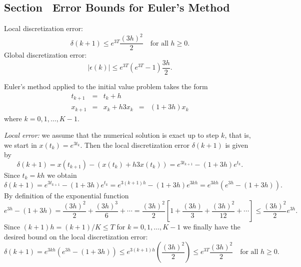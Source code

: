 \subsection*{Section~\protect{\ref{sec:EEEM}} Error Bounds for Euler's Method}

 \ans Local discretization error:
\[
\delta(k+1) \le
e^{3T}\frac{(3h)^2}{2} \quad \mbox{for all $h\ge 0$.}
\]
Global discretization error:
\[
|\epsilon(k)| \le e^{3T}(e^{3T}-1)\frac{3h}{2}.
\]

\soln Euler's method applied to the initial value problem takes the form
\[
\begin{array}{rclcl}
t_{k+1} & = & t_k+h & & \\
x_{k+1} & = & x_k + h 3 x_k & = & (1+3h)x_k
\end{array}
\]
where $k=0,1,\ldots,K-1$.

{\em Local error:} we assume that the
numerical solution is exact up to step $k$, that is,
we start in $x(t_k)=e^{3t_k}$.  Then the local discretization error
$\delta(k+1)$ is given by
\[
\delta(k+1) = x(t_{k+1}) - (x(t_k) + h 3x(t_k))=
e^{3t_{k+1}} - (1+3h)e^{t_k}.
\]
Since $t_k = kh$ we obtain
\[
\delta(k+1) = e^{3t_{k+1}} - (1+3h)e^{t_k} =
e^{3(k+1)h} - (1+3h)e^{3kh} = e^{3kh}(e^{3h}-(1+3h)).
\]
By definition of the exponential function
\[
e^{3h}-(1+3h) = \frac{(3h)^2}{2}+\frac{(3h)^3}{6}+\cdots =
\frac{(3h)^2}{2}\left[ 1+\frac{(3h)}{3}+\frac{(3h)^2}{12}+\cdots\right]
\le \frac{(3h)^2}{2}e^{3h}.
\]
Since $(k+1)h=(k+1)/K\le T$ for $k=0,1,\ldots,K-1$ we finally have the
desired bound on the local discretization error:
\[
\delta(k+1) = e^{3kh}(e^{3h}-(1+3h)) \le
e^{3(k+1)h}\left(\frac{(3h)^2}{2}\right)\le
e^{3T}\frac{(3h)^2}{2} \quad \mbox{for all $h\ge 0$.}
\]

